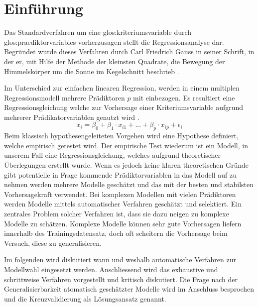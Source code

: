 \section{Einführung}
Das Standardverfahren um eine \Gls{glos:kriteriumsvariable} durch \Glspl{glos:praediktorvariable} vorherzusagen stellt die Regressionsanalyse dar.
Begründet wurde dieses Verfahren durch Carl Friedrich Gauss in seiner Schrift, in der er, mit Hilfe der Methode der kleinsten Quadrate, die Bewegung der Himmelskörper um die Sonne im Kegelschnitt beschrieb \cite{gauss1809theoria}. 

Im Unterschied zur einfachen linearen Regression, werden in einem multiplen Regressionsmodell mehrere Prädiktoren $p$ mit einbezogen. 
Es resultiert eine Regressionsgleichung welche zur Vorhersage einer Kriteriumsvariable aufgrund mehrerer Prädikatorvariablen genutzt wird  \cite[S. 448]{bortz2011}. 
\begin{equation}
x_i = \beta_0 + \beta_1\cdot x_{i1} + ... +  \beta_p\cdot x_{ip} + \epsilon_i
\tag{multiple lineare Regression}
\end{equation}
Beim klassisch hypothesengeleiteten Vorgehen wird eine Hypothese definiert, welche empirisch getestet wird.
Der empirische Test wiederum ist ein Modell, in unserem Fall eine Regressionsgleichung, welches aufgrund theoretischer Überlegungen erstellt wurde.
Wenn es jedoch keine klaren theoretischen Gründe gibt potentielle in Frage kommende Prädiktorvariablen in das Modell auf zu nehmen werden mehrere Modelle geschätzt und das mit der besten und stabilsten Vorhersagekraft verwendet.
Bei komplexen Modellen mit vielen Prädiktoren werden Modelle mittels automatischer Verfahren geschätzt und selektiert.
Ein zentrales Problem solcher Verfahren ist, dass sie dazu neigen zu komplexe Modelle zu schätzen. 
Komplexe Modelle können sehr gute Vorhersagen liefern innerhalb des Trainingsdatensatz, doch oft scheitern die Vorhersage beim Versuch, diese zu generalisieren.  

Im folgenden wird diskutiert wann und weshalb automatische Verfahren zur Modellwahl eingesetzt werden. 
Anschliessend wird das exhaustive und schrittweise Verfahren vorgestellt und kritisch diskutiert.
Die Frage nach der Generalisierbarkeit atomatisch geschätzter Modelle wird im Anschluss besprochen und die Kreuzvalidierung als Lösungsansatz genannt.